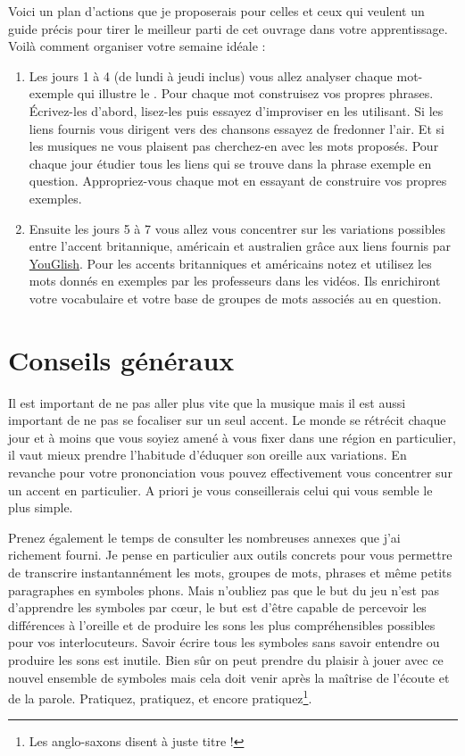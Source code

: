 Voici un plan d'actions que je proposerais pour celles et ceux qui
veulent un guide précis pour tirer le meilleur parti de cet ouvrage
dans votre apprentissage. Voilà comment organiser votre semaine idéale :

\begin{enumerate}
\item Les jours 1 à 4 (de lundi à jeudi inclus) vous allez analyser
  chaque mot-exemple qui illustre le \son. Pour chaque mot construisez
  vos propres phrases. \'Ecrivez-les d'abord, lisez-les puis essayez
  d'improviser en les utilisant. Si les liens fournis vous dirigent
  vers des chansons essayez de fredonner l'air. Et si les musiques ne
  vous plaisent pas cherchez-en avec les mots proposés. Pour chaque
  jour étudier tous les liens qui se trouve dans la phrase exemple en
  question. Appropriez-vous chaque mot en essayant de construire vos
  propres exemples. 
\item  Ensuite les jours 5 à 7 vous allez vous concentrer sur les variations
 possibles entre l'accent britannique, américain et australien grâce
 aux liens fournis par
 \href{https://youtu.be/IBsEkslVxoQ}{YouGlish}. Pour les accents
 britanniques et américains notez et utilisez les mots donnés en
 exemples par les professeurs dans les vidéos. Ils enrichiront votre
 vocabulaire et votre base de groupes de mots associés au \son en question.
\end{enumerate}

\section{Conseils généraux}\label{sec:gen}

Il est important de ne pas aller plus vite que la musique mais il est
aussi important de ne pas se focaliser sur un seul accent. Le monde
se rétrécit chaque jour et à moins que vous soyiez amené à vous fixer
dans une région en particulier, il vaut mieux prendre l'habitude
d'éduquer son oreille aux variations. En revanche pour votre
prononciation vous pouvez effectivement vous concentrer sur un accent
en particulier. A priori je vous conseillerais celui qui vous semble
le plus simple.  

Prenez également le temps de consulter les nombreuses annexes que j'ai
richement fourni. Je pense en particulier aux outils concrets pour
vous permettre de transcrire instantannément les mots, groupes de
mots, phrases et même petits paragraphes en symboles \glspl{phon}. Mais
n'oubliez pas que le but du jeu n'est pas d'apprendre les symboles par
c{\oe}ur, le but est d'être capable de percevoir les différences à
l'oreille et de produire les sons les plus compréhensibles possibles
pour vos interlocuteurs. Savoir écrire tous les symboles sans savoir
entendre ou produire les sons est inutile. Bien sûr on peut prendre du
plaisir à jouer avec ce nouvel ensemble de symboles mais cela doit
venir après la maîtrise de l'écoute et de la parole. Pratiquez,
pratiquez, et encore pratiquez\footnote{Les anglo-saxons disent
   à juste titre !}. 

